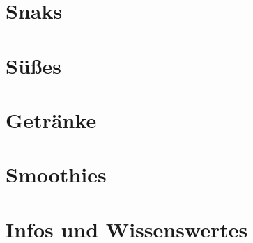 \documentclass[a4paper]{scrartcl}
\begin{document}
\section{Snaks} %


\section{Süßes} %



\section{Getränke} %


\section{Smoothies} %


\section{Infos und Wissenswertes} %
	

\end{document}
